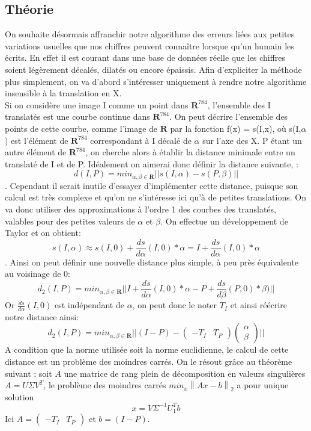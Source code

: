 \documentclass[a4paper,11pt,twoside]{report}
\newcommand{\norm}[1]{\left\lVert#1\right\rVert} %
\begin{document}
\subsection{Théorie}
On souhaite désormais affranchir notre algorithme des erreurs liées aux petites variations usuelles que nos chiffres peuvent connaître lorsque qu'un humain les écrits. En effet il est courant dans une base de données réelle que les chiffres soient légèrement décalés, dilatés ou encore épaissis. Afin d'expliciter la méthode plus simplement, on va d'abord s’intéresser uniquement à rendre notre algorithme insensible à la translation en X. \\
Si on considère une image I comme un point dans $\textbf{R}^{784}$, l'ensemble des I translatés est une courbe continue dans $\textbf{R}^{784}$. On peut décrire l'ensemble des points de cette courbe, comme l'image de $\textbf{R}$ par la fonction f(x) = s(I,x), où s(I,$\alpha$) est l'élément de  $\textbf{R}^{784}$ correspondant à I décalé de $\alpha$ sur l'axe des X. P étant un autre élément de $\textbf{R}^{784}$, on cherche alors à établir la distance minimale entre un translaté de I et de P. Idéalement on aimerai donc définir la distance suivante, : $$d(I,P)= min_{\alpha,\beta \in \textbf{R}} ||s(I,\alpha)-s(P,\beta)||$$. 
Cependant il serait inutile d'essayer d'implémenter cette distance, puisque son calcul est très complexe et qu'on ne s’intéresse ici qu'à de petites translations. On va donc utiliser des approximations à l'ordre 1 des courbes des translatés, valables pour des petites valeurs de $\alpha$ et $\beta$. On effectue un développement de Taylor et on obtient:$$s(I,\alpha)\approx s(I,0) + \frac{ds}{d\alpha}(I,0)*\alpha=I + \frac{ds}{d\alpha}(I,0)*\alpha$$.
Ainsi on peut définir une nouvelle distance plus simple, à peu près équivalente au voisinage de 0: $$d_{2}(I,P)= min_{\alpha,\beta \in \textbf{R}} ||I+\frac{ds}{d\alpha}(I,0)*\alpha-P+\frac{ds}{d\beta}(P,0)*\beta)||$$
Or $\frac{ds}{d\alpha}(I,0)$ est indépendant de $\alpha$, on peut donc le noter $T_{I}$ et ainsi réécrire notre distance ainsi: $$d_{2}(I,P)= min_{\alpha,\beta \in \textbf{R}} ||(I-P)-\begin{pmatrix}-T_{I} & T_{P}\end{pmatrix} \begin{pmatrix}\alpha \\ \beta\end{pmatrix} ||$$ 
A condition que la norme utilisée soit la norme euclidienne, le calcul de cette distance est un problème des moindres carrés. On le résout grâce au théorème suivant : soit $A$ une matrice de rang plein de décomposition en valeurs singulières $A = U\Sigma V^T$, le problème des moindres carrés $min_x\norm{Ax-b}_2$ a pour unique solution $$x = V\Sigma^{-1}U_1^Tb$$ Ici $A = \begin{pmatrix}-T_{I} & T_{P}\end{pmatrix}$ et $b = (I-P)$.\\
\end{document}
